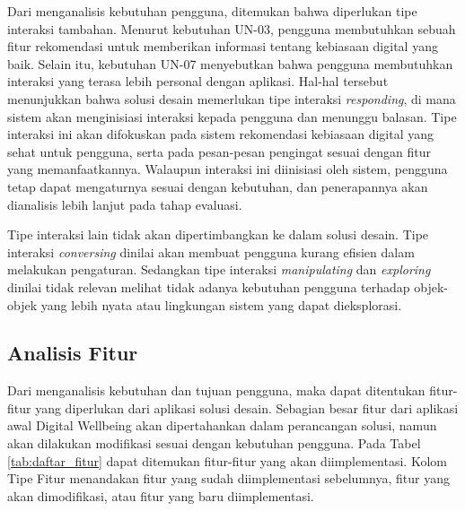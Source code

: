 Dari menganalisis kebutuhan pengguna, ditemukan bahwa diperlukan tipe interaksi tambahan. Menurut kebutuhan UN-03, pengguna membutuhkan sebuah fitur rekomendasi untuk memberikan informasi tentang kebiasaan digital yang baik. Selain itu, kebutuhan UN-07 menyebutkan bahwa pengguna membutuhkan interaksi yang terasa lebih personal dengan aplikasi. Hal-hal tersebut menunjukkan bahwa solusi desain memerlukan tipe interaksi \textit{responding}, di mana sistem akan menginisiasi interaksi kepada pengguna dan menunggu balasan. Tipe interaksi ini akan difokuskan pada sistem rekomendasi kebiasaan digital yang sehat untuk pengguna, serta pada pesan-pesan pengingat sesuai dengan fitur yang memanfaatkannya. Walaupun interaksi ini diinisiasi oleh sistem, pengguna tetap dapat mengaturnya sesuai dengan kebutuhan, dan penerapannya akan dianalisis lebih lanjut pada tahap evaluasi.

Tipe interaksi lain tidak akan dipertimbangkan ke dalam solusi desain. Tipe interaksi \textit{conversing} dinilai akan membuat pengguna kurang efisien dalam melakukan pengaturan. Sedangkan tipe interaksi \textit{manipulating} dan \textit{exploring} dinilai tidak relevan melihat tidak adanya kebutuhan pengguna terhadap objek-objek yang lebih nyata atau lingkungan sistem yang dapat dieksplorasi.


\subsection{Analisis Fitur}
\label{subsec:analisis_fitur}

Dari menganalisis kebutuhan dan tujuan pengguna, maka dapat ditentukan fitur-fitur yang diperlukan dari aplikasi solusi desain. Sebagian besar fitur dari aplikasi awal Digital Wellbeing akan dipertahankan dalam perancangan solusi, namun akan dilakukan modifikasi sesuai dengan kebutuhan pengguna.  Pada Tabel \ref{tab:daftar_fitur} dapat ditemukan fitur-fitur yang akan diimplementasi. Kolom Tipe Fitur menandakan fitur yang sudah diimplementasi sebelumnya, fitur yang akan dimodifikasi, atau fitur yang baru diimplementasi. 

